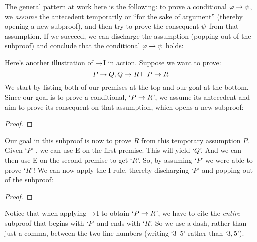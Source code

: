 The general pattern at work here is the following: to prove a conditional $\mathcal{\varphi} \rightarrow \mathcal{\psi}$, we \emph{assume} the antecedent \meta{\varphi} temporarily or ``for the sake of argument'' (thereby opening a new subproof), and then try to prove the consequent $\mathcal{\psi}$ from that assumption. If we succeed, we can discharge the assumption (popping out of the subproof) and conclude that the conditional $\mathcal{\varphi} \rightarrow \mathcal{\psi}$ holds:

Here's another illustration of $\rightarrow$I in action. Suppose we want to prove:
	$$P \rightarrow Q, Q \rightarrow R \vdash P \rightarrow R$$
We start by listing both of our premises at the top and our goal at the bottom. Since our goal is to prove a conditional, `$P \rightarrow R$', we assume its antecedent and aim to prove its consequent on that assumption, which opens a new subproof:
\begin{proof}
	  
	  
	\open
		  
		\have[\ ]{}{\vdots}
	\close
\end{proof}
Our goal in this subproof is now to prove $R$ from this temporary assumption $P$.  Given `$P$' , we can use {\eif}E on the first premise. This will yield `$Q$'. And we can then use {\eif}E on the second premise to get `$R$'. So, by assuming `$P$' we were able to prove `$R$'!  We can now apply the {\eif}I rule, thereby discharging `$P$' and popping out of the subproof:\label{HSproof}
\begin{proof}
	  
	  
	\open
		 
	\close
\end{proof}
Notice that when applying $\rightarrow$I to obtain `$P \rightarrow R$', we have to cite the \emph{entire} subproof that begins with `$P$' and ends with `$R$'.  So we use a dash, rather than just a comma, between the two line numbers (writing `$3$--$5$' rather than `$3,5$').

